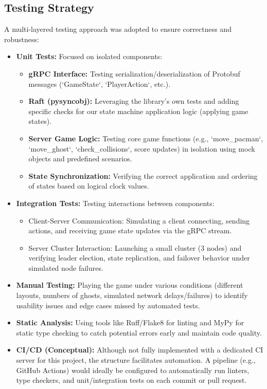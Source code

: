 \documentclass[11pt]{article}
\begin{document}
\subsection{Testing Strategy}
A multi-layered testing approach was adopted to ensure correctness and robustness:
\begin{itemize}
    \item \textbf{Unit Tests:} Focused on isolated components:
        \begin{itemize}
            \item \textbf{gRPC Interface:} Testing serialization/deserialization of Protobuf messages (`GameState`, `PlayerAction`, etc.).
            \item \textbf{Raft (pysyncobj):} Leveraging the library's own tests and adding specific checks for our state machine application logic (applying game states).
            \item \textbf{Server Game Logic:} Testing core game functions (e.g., `move_pacman`, `move_ghost`, `check_collisions`, score updates) in isolation using mock objects and predefined scenarios.
            \item \textbf{State Synchronization:} Verifying the correct application and ordering of states based on logical clock values.
        \end{itemize}
    \item \textbf{Integration Tests:} Testing interactions between components:
        \begin{itemize}
            \item Client-Server Communication: Simulating a client connecting, sending actions, and receiving game state updates via the gRPC stream.
            \item Server Cluster Interaction: Launching a small cluster (3 nodes) and verifying leader election, state replication, and failover behavior under simulated node failures.
        \end{itemize}
    \item \textbf{Manual Testing:} Playing the game under various conditions (different layouts, numbers of ghosts, simulated network delays/failures) to identify usability issues and edge cases missed by automated tests.
    \item \textbf{Static Analysis:} Using tools like Ruff/Flake8 for linting and MyPy for static type checking to catch potential errors early and maintain code quality.
    \item \textbf{CI/CD (Conceptual):} Although not fully implemented with a dedicated CI server for this project, the structure facilitates automation. A pipeline (e.g., GitHub Actions) would ideally be configured to automatically run linters, type checkers, and unit/integration tests on each commit or pull request.
\end{itemize}
\end{document}
